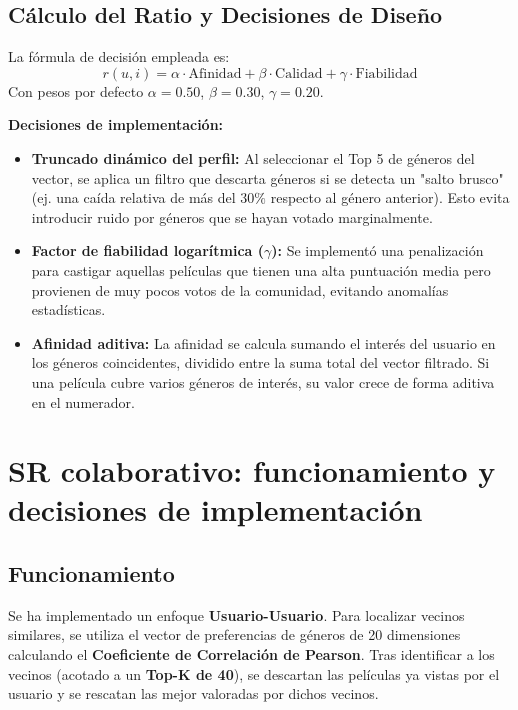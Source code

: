 \documentclass[12pt]{scrartcl}
\begin{document}
\subsection{Cálculo del Ratio y Decisiones de Diseño}
La fórmula de decisión empleada es:
\begin{equation}
    r(u,i) = \alpha \cdot \text{Afinidad} + \beta \cdot \text{Calidad} + \gamma \cdot \text{Fiabilidad}
\end{equation}
Con pesos por defecto $\alpha=0.50$, $\beta=0.30$, $\gamma=0.20$.

\textbf{Decisiones de implementación:}
\begin{itemize}
    \item \textbf{Truncado dinámico del perfil:} Al seleccionar el Top 5 de géneros del vector, se aplica un filtro que descarta géneros si se detecta un "salto brusco" (ej. una caída relativa de más del $30\%$ respecto al género anterior). Esto evita introducir ruido por géneros que se hayan votado marginalmente.
    \item \textbf{Factor de fiabilidad logarítmica ($\gamma$):} Se implementó una penalización para castigar aquellas películas que tienen una alta puntuación media pero provienen de muy pocos votos de la comunidad, evitando anomalías estadísticas.
    \item \textbf{Afinidad aditiva:} La afinidad se calcula sumando el interés del usuario en los géneros coincidentes, dividido entre la suma total del vector filtrado. Si una película cubre varios géneros de interés, su valor crece de forma aditiva en el numerador.
\end{itemize}

\section{SR colaborativo: funcionamiento y decisiones de implementación}

\subsection{Funcionamiento}
Se ha implementado un enfoque \textbf{Usuario-Usuario}. Para localizar vecinos similares, se utiliza el vector de preferencias de géneros de 20 dimensiones calculando el \textbf{Coeficiente de Correlación de Pearson}.
Tras identificar a los vecinos (acotado a un \textbf{Top-K de 40}), se descartan las películas ya vistas por el usuario y se rescatan las mejor valoradas por dichos vecinos.
\end{document}
